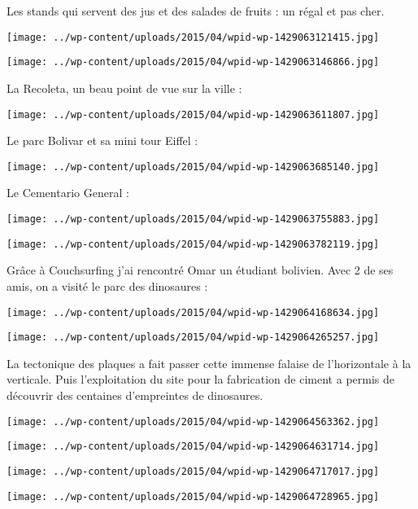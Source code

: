   Les stands qui servent des jus et des salades de fruits : un régal et pas cher. 
\begin{center} \texttt{[image: ../wp-content/uploads/2015/04/wpid-wp-1429063121415.jpg]} \end{center}
\begin{center} \texttt{[image: ../wp-content/uploads/2015/04/wpid-wp-1429063146866.jpg]} \end{center}

 La Recoleta, un beau point de vue sur la ville :
\begin{center} \texttt{[image: ../wp-content/uploads/2015/04/wpid-wp-1429063611807.jpg]} \end{center}

\pagebreak
 Le parc Bolivar et sa mini tour Eiffel :
\begin{center} \texttt{[image: ../wp-content/uploads/2015/04/wpid-wp-1429063685140.jpg]} \end{center}

 Le Cementario General :
\begin{center} \texttt{[image: ../wp-content/uploads/2015/04/wpid-wp-1429063755883.jpg]} \end{center}
\begin{center} \texttt{[image: ../wp-content/uploads/2015/04/wpid-wp-1429063782119.jpg]} \end{center}

 Grâce à Couchsurfing j'ai rencontré Omar un étudiant bolivien. Avec 2 de ses amis, on a visité le parc des dinosaures :
\begin{center} \texttt{[image: ../wp-content/uploads/2015/04/wpid-wp-1429064168634.jpg]} \end{center}
\begin{center} \texttt{[image: ../wp-content/uploads/2015/04/wpid-wp-1429064265257.jpg]} \end{center}

 La tectonique des plaques a fait passer cette immense falaise de l'horizontale à la verticale. Puis l'exploitation du site pour la fabrication de ciment a permis de découvrir des centaines d'empreintes de dinosaures. 
\begin{center} \texttt{[image: ../wp-content/uploads/2015/04/wpid-wp-1429064563362.jpg]} \end{center}
\begin{center} \texttt{[image: ../wp-content/uploads/2015/04/wpid-wp-1429064631714.jpg]} \end{center}
\begin{center} \texttt{[image: ../wp-content/uploads/2015/04/wpid-wp-1429064717017.jpg]} \end{center}
\begin{center} \texttt{[image: ../wp-content/uploads/2015/04/wpid-wp-1429064728965.jpg]} \end{center}